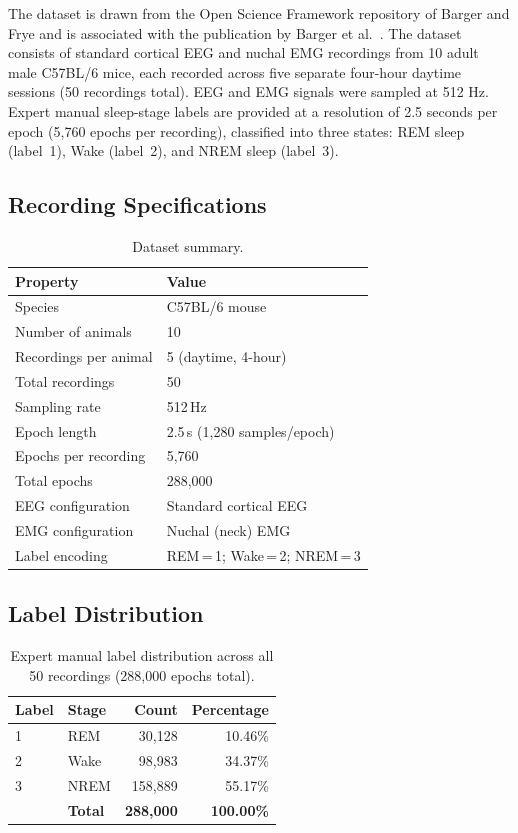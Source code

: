\documentclass[12pt,a4paper]{article}
\begin{document}
The dataset is drawn from the Open Science Framework repository of Barger and
Frye \citep{BargerOSF2025} and is associated with the publication by Barger
et al.\ \citep{Barger2019}. The dataset consists of standard cortical EEG
and nuchal EMG recordings from 10 adult male C57BL/6 mice, each recorded
across five separate four-hour daytime sessions (50 recordings total). EEG and
EMG signals were sampled at 512 Hz. Expert manual sleep-stage labels are
provided at a resolution of 2.5 seconds per epoch (5,760 epochs per recording),
classified into three states: REM sleep (label~1), Wake (label~2), and NREM
sleep (label~3).

\subsection{Recording Specifications}

\begin{table}[H]
\centering
\caption{Dataset summary.}
\label{tab:dataset}
\begin{tabular}{ll}
\toprule
Property & Value \\
\midrule
Species & C57BL/6 mouse \\
Number of animals & 10 \\
Recordings per animal & 5 (daytime, 4-hour) \\
Total recordings & 50 \\
Sampling rate & 512\,Hz \\
Epoch length & 2.5\,s (1,280 samples/epoch) \\
Epochs per recording & 5,760 \\
Total epochs & 288,000 \\
EEG configuration & Standard cortical EEG \\
EMG configuration & Nuchal (neck) EMG \\
Label encoding & REM\,=\,1; Wake\,=\,2; NREM\,=\,3 \\
\bottomrule
\end{tabular}
\end{table}

\subsection{Label Distribution}

\begin{table}[H]
\centering
\caption{Expert manual label distribution across all 50 recordings (288,000 epochs total).}
\label{tab:labels}
\begin{tabular}{llrr}
\toprule
Label & Stage & Count & Percentage \\
\midrule
1 & REM  & 30,128  & 10.46\% \\
2 & Wake & 98,983  & 34.37\% \\
3 & NREM & 158,889 & 55.17\% \\
\midrule
  & \textbf{Total} & \textbf{288,000} & \textbf{100.00\%} \\
\bottomrule
\end{tabular}
\end{table}
\end{document}
